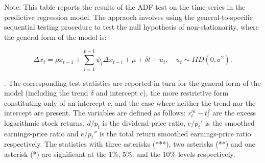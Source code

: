 \documentclass[harvard,11pt]{article}
\begin{document}
\begin{table}[!hbtp]
Note: This table reports the results of the ADF test on the time-series in the predictive regression model. The appraoch involves using the general-to-specific sequential testing procedure to test the null hypothesis of non-stationarity, where the general form of the model is:
\begin{minipage}{\linewidth}
\begin{equation*}
\Delta x_t=\rho x_{t-1}+\sum\limits_{i=1}^{p-1}\psi_i\Delta x_{t-i}+\mu+\delta t+u_t,\quad u_t\sim IID(0,\sigma^2).
\end{equation*}
\end{minipage}. 
The corresponding test statistics are reported in turn for the general form of the model (including the trend $\delta$ and intercept $c$), the more restrictive form constituting only of an intercept $c$, and the case where neither the trend nor the intercept are present. The variables are defined as follows: $r_t^m-t_t^f$ are the excess logarithmic stock returns, $d/p_t$ is the dividend-price ratio, $e/p_t'$ is the smoothed earnings-price ratio and $e/p_t''$ is the total return smoothed earnings-price ratio respectively. The statistics with three asterisks (***), two asterisks (**) and one asterisk (*) are significant at the 1\%, 5\%. and the 10\% levels respectively.
\label{tabu: ADF}
\end{table}
\end{document}
